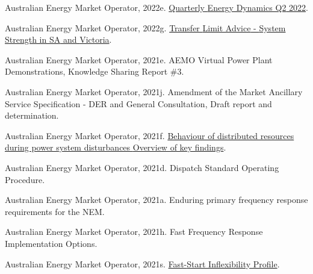 \documentclass[12pt,a4paper,]{report}
\newlength{\cslhangindent}
\newenvironment{CSLReferences}[2] %
 {%
  \setlength{\parindent}{0pt}
  \ifodd #1 \everypar{\setlength{\hangindent}{\cslhangindent}}\ignorespaces\fi
  \ifnum #2 > 0
  \setlength{\parskip}{#2\baselineskip}
  \fi
 }%
 {}
\begin{document}
\begin{CSLReferences}{1}{0}
\leavevmode{}%
Australian Energy Market Operator, 2022e.
\href{https://www.aemo.com.au/-/media/files/major-publications/qed/2022/qed-q2-2022.pdf?la=en}{Quarterly
{Energy Dynamics Q2} 2022}.

\leavevmode{}%
Australian Energy Market Operator, 2022g.
\href{https://www.aemo.com.au/-/media/files/electricity/nem/security_and_reliability/congestion-information/transfer-limit-advice-system-strength.pdf?la=en}{Transfer
{Limit Advice} - {System Strength} in {SA} and {Victoria}}.

\leavevmode{}%
Australian Energy Market Operator, 2021e. {AEMO Virtual Power Plant
Demonstrations}, {Knowledge Sharing Report} \#3.

\leavevmode{}%
Australian Energy Market Operator, 2021j. Amendment of the {Market
Ancillary Service Specification} - {DER} and {General Consultation},
{Draft} report and determination.

\leavevmode{}%
Australian Energy Market Operator, 2021f.
\href{https://aemo.com.au/en/initiatives/major-programs/nem-distributed-energy-resources-der-program/operations/der-behaviour-during-disturbances}{Behaviour
of distributed resources during power system disturbances {Overview} of
key findings}.

\leavevmode{}%
Australian Energy Market Operator, 2021d. Dispatch {Standard Operating
Procedure}.

\leavevmode{}%
Australian Energy Market Operator, 2021a. Enduring primary frequency
response requirements for the {NEM}.

\leavevmode{}%
Australian Energy Market Operator, 2021h. Fast {Frequency Response
Implementation Options}.

\leavevmode{}%
Australian Energy Market Operator, 2021s.
\href{https://aemo.com.au/-/media/files/electricity/nem/security_and_reliability/dispatch/policy_and_process/fast-start-unit-inflexibility-profile.pdf}{Fast-{Start
Inflexibility Profile}}.


\end{CSLReferences}
\end{document}

